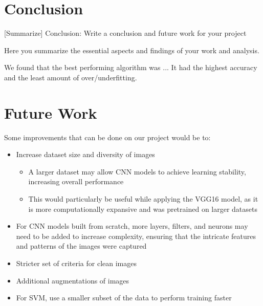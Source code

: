 %

\section{Conclusion}
[Summarize]
Conclusion: Write a conclusion and future work for your project

Here you summarize the essential aspects and findings 
of your work and analysis.

We found that the best performing algorithm was ...
It had the highest accuracy and the least amount of over/underfitting.

\section{Future Work}

Some improvements that can be done on our project would be to:
\begin{itemize}
    \item Increase dataset size and diversity of images
    \begin{itemize}
        \item A larger dataset may allow CNN models to achieve learning stability, increasing overall performance
        \item This would particularly be useful while applying the VGG16 model, as it is more computationally expansive and was pretrained on larger datasets
    \end{itemize}
    \item For CNN models built from scratch, more layers, filters, and neurons may need to be added to increase complexity, ensuring that the intricate features and patterns of the images were captured
    \item Stricter set of criteria for clean images
    \item Additional augmentations of images
    \item For SVM, use a smaller subset of the data to perform training faster
\end{itemize}